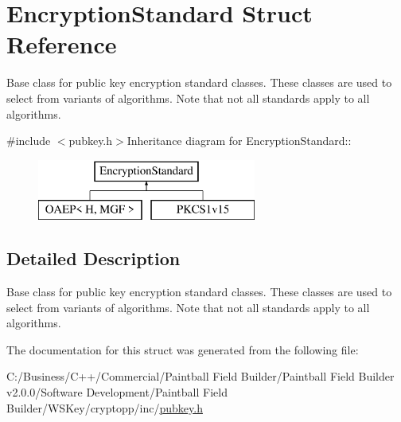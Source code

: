 \hypertarget{struct_encryption_standard}{
\section{EncryptionStandard Struct Reference}
\label{struct_encryption_standard}
}


Base class for public key encryption standard classes. These classes are used to select from variants of algorithms. Note that not all standards apply to all algorithms.  


{\ttfamily \#include $<$pubkey.h$>$}Inheritance diagram for EncryptionStandard::\begin{figure}[H]
\begin{center}
\leavevmode
\includegraphics[height=2cm]{struct_encryption_standard}
\end{center}
\end{figure}


\subsection{Detailed Description}
Base class for public key encryption standard classes. These classes are used to select from variants of algorithms. Note that not all standards apply to all algorithms. 

The documentation for this struct was generated from the following file:\begin{DoxyCompactItemize}
\item 
C:/Business/C++/Commercial/Paintball Field Builder/Paintball Field Builder v2.0.0/Software Development/Paintball Field Builder/WSKey/cryptopp/inc/\hyperlink{pubkey_8h}{pubkey.h}\end{DoxyCompactItemize}

